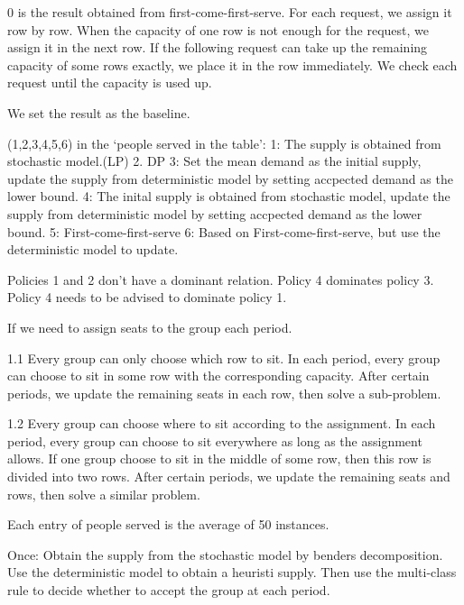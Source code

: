 0 is the result obtained from first-come-first-serve. For each request, we assign it row by row. When the capacity of one row is not enough for the request, we assign it in the next row. If the following request can take up the remaining capacity of some rows exactly, we place it in the row immediately. We check each request until the capacity is used up.

We set the result as the baseline.

(1,2,3,4,5,6) in the `people served in the table': 
1: The supply is obtained from stochastic model.(LP) 
2. DP
3: Set the mean demand as the initial supply, update the supply from deterministic model by setting accpected demand as the lower bound. 
4: The inital supply is obtained from stochastic model, update the supply from deterministic model by setting accpected demand as the lower bound.
5: First-come-first-serve
6: Based on First-come-first-serve, but use the deterministic model to update.

Policies 1 and 2 don't have a dominant relation. Policy 4 dominates policy 3.
Policy 4 needs to be advised to dominate policy 1.

If we need to assign seats to the group each period.

1.1 Every group can only choose which row to sit.
In each period, every group can choose to sit in some row with the corresponding capacity. 
After certain periods, we update the remaining seats in each row, then solve a sub-problem. 

1.2 Every group can choose where to sit according to the assignment.
In each period, every group can choose to sit everywhere as long as the assignment allows. If one group choose to sit in the middle of some row, then this row is divided into two rows. 
After certain periods, we update the remaining seats and rows, then solve a similar problem.



Each entry of people served is the average of 50 instances.


Once: Obtain the supply from the stochastic model by benders decomposition. Use the deterministic model to obtain a heuristi supply. Then use the multi-class rule to decide whether to accept the group at each period.

